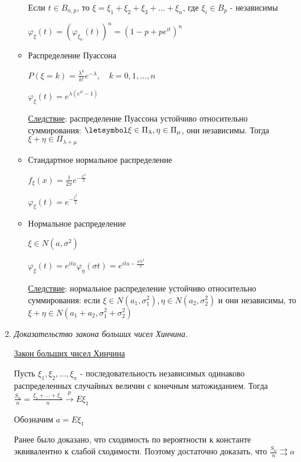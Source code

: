 \begin{enumerate}
\begin{itemize}
        Если $t \in B_{n,p}$, то $\xi = \xi_1 + \xi_2 + \xi_3 + \dots + \xi_n$, где $\xi_i \in B_p$ - независимы

        $\varphi_\xi(t) = (\varphi_{\xi_n}(t))^n = (1 - p + p e^{it})^n$

        \item Распределение Пуассона

        $P(\xi = k) = \frac{\lambda^k}{k!} e^{-\lambda}, \quad k = 0, 1, \dots, n$

        $\varphi_\xi(t) = e^{\lambda (e^{it} - 1)}$

        \underline{Следствие}: распределение Пуассона устойчиво относительно суммирования: $\letsymbol \xi \in \Pi_\lambda, \eta \in \Pi_\mu$, они независимы. Тогда $\xi + \eta \in \Pi_{\lambda + \mu}$

        \item Стандартное нормальное распределение

        $f_\xi(x) = \frac{1}{2\pi} e^{-\frac{x^2}{2}}$

        $\varphi_\xi(t) = e^{-\frac{t^2}{2}}$

        \item Нормальное распределение

        $\xi \in N(a, \sigma^2)$

        $\varphi_\xi(t) = e^{ita} \varphi_\eta(\sigma t) = e^{ita - \frac{\sigma^2t^2}{2}}$

        \underline{Следствие}: нормальное распределение устойчиво относительно суммирования: если $\xi \in N(a_1, \sigma_1^2), \eta \in N(a_2, \sigma^2_2)$ и они независимы, то $\xi + \eta \in N(a_1 + a_2, \sigma_1^2 + \sigma_2^2)$

    \end{itemize}

    \item \textit{Доказательство закона больших чисел Хинчина.}

    \hyperlink{lawofbignumberskhinchin2}{Закон больших чисел Хинчина}
    
    Пусть $\xi_1, \xi_2, \dots, \xi_n$ - последовательность независимых одинаково распределенных случайных величин с конечным матожиданием.
    Тогда $\frac{S_n}{n} = \frac{\xi_1 + \dots + \xi_n}{n} \overset{p}{\longrightarrow} E\xi_1$
    
    \begin{MyProof}
        Обозначим $a = E\xi_1$
    
        Ранее было доказано, что сходимость по вероятности к константе эквивалентно к слабой сходимости. Поэтому достаточно доказать, что $\frac{S_n}{n} \rightrightarrows a$
    

\end{MyProof}
\end{enumerate}
